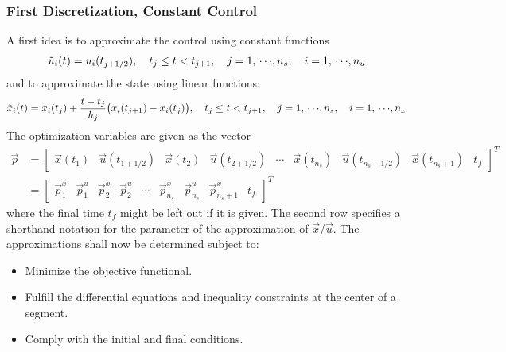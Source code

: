 			\subsubsection{First Discretization, Constant Control} %
				A first idea is to approximate the control using constant functions
				\begin{align*}
					\tilde{u}_i(t) = u_i(t_{j + 1/2}),\quad t_j \leq t < t_{j + 1},\quad j = 1,\,\cdots\!,n_s,\quad i = 1,\,\cdots\!,n_u
				\end{align*}
				and to approximate the state using linear functions:
				\begin{align*}
					\tilde{x}_i(t) = x_i(t_j) + \frac{t - t_j}{h_j} \big( x_i(t_{j + 1}) - x_i(t_j) \big),\quad t_j \leq t < t_{j + 1},\quad j = 1,\,\cdots\!,n_s,\quad i = 1,\,\cdots\!,n_x
				\end{align*}
				The optimization variables are given as the vector
				\begin{align*}
					\vec{p}
					 & = \begin{bmatrix} \vec{x}(t_1) & \vec{u}(t_{1 + 1/2}) & \vec{x}(t_2) & \vec{u}(t_{2 + 1/2}) & \cdots & \vec{x}(t_{n_s}) & \vec{u}(t_{n_s + 1/2}) & \vec{x}(t_{n_s + 1}) & t_f \end{bmatrix}^T \\
					 & = \begin{bmatrix} \vec{p}_1^x & \vec{p}_1^u & \vec{p}_2^x  & \vec{p}_2^u & \cdots & \vec{p}_{n_s}^x & \vec{p}_{n_s}^u & \vec{p}_{n_s + 1}^x & t_f \end{bmatrix}^T
				\end{align*}
				where the final time \(t_f\) might be left out if it is given. The second row specifies a shorthand notation for the parameter of the approximation of \(\vec{x}\)/\(\vec{u}\). The approximations shall now be determined subject to:
				\begin{itemize}
					\item Minimize the objective functional.
					\item Fulfill the differential equations and inequality constraints at the center of a segment.
					\item Comply with the initial and final conditions.
				\end{itemize}

